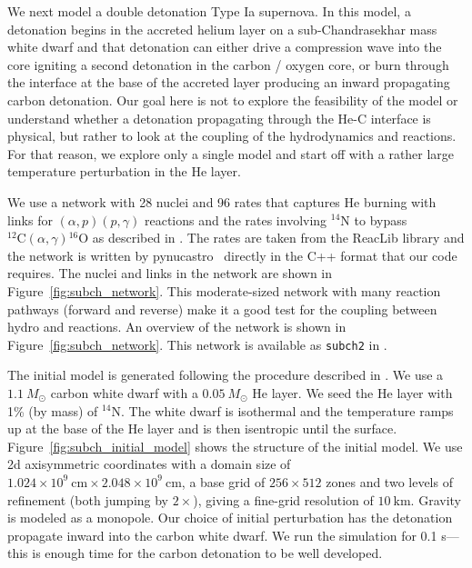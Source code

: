 \documentclass{aastex63}
\newcommand{\pynucastro}{{\sf pynucastro}}
\newcommand{\isot}[2]{$^{#2}\mathrm{#1}$}
\newcommand{\isotm}[2]{{}^{#2}\mathrm{#1}}
\newcommand{\MarginPar}[1]{\marginpar{\vskip-\baselineskip\raggedright\tiny\sffamily\hrule\smallskip{\color{red}#1}\par\smallskip\hrule}}
\begin{document}
We next model a double detonation Type Ia
supernova.  In this model, a detonation begins in the accreted helium
layer on a sub-Chandrasekhar mass white dwarf and that detonation can
either drive a compression wave into the core igniting a second
detonation in the carbon / oxygen core, or burn through the interface
at the base of the accreted layer producing an inward propagating
carbon detonation.  Our goal here is not to explore the feasibility of
the model or understand whether a detonation propagating through the
He-C interface is physical, but rather to look at the coupling of the
hydrodynamics and reactions.  For that reason, we explore only a
single model and start off with a rather large temperature
perturbation in the He layer.

We use a network with 28 nuclei and 96 rates that captures He burning \MarginPar{should I do a few aprox13 runs for comparison?}
with links for $(\alpha,p)(p,\gamma)$ reactions and the rates
involving \isot{N}{14} to bypass
$\isotm{C}{12}(\alpha,\gamma)\isotm{O}{16}$ as described in
\cite{shenbildsten}.  The rates are taken from the ReacLib library
\citep{reaclib} and the network is written by
\pynucastro~\citep{pynucastro} directly in the C++ format that our
code requires.  The nuclei and links in the network are shown in
Figure~\ref{fig:subch_network}.  This moderate-sized network with many
reaction pathways (forward and reverse) make it a good test for the
coupling between hydro and reactions.  An overview of the network is
shown in Figure~\ref{fig:subch_network}.  This network is available 
as {\tt subch2} in \citep{microphysics}.


The initial model is generated following the procedure described in
\citep{subchandra}.  We use a $1.1~M_\odot$ carbon white dwarf with a
$0.05~M_\odot$ He layer.  We seed the He layer with 1\% (by mass) of
\isot{N}{14}.  The white dwarf is isothermal and the temperature ramps
up at the base of the He layer and is then isentropic until the
surface.  Figure~\ref{fig:subch_initial_model} shows the structure of
the initial model.  We use 2d axisymmetric coordinates with a domain
size of $1.024\times 10^9~\mathrm{cm} \times 2.048\times
10^9~\mathrm{cm}$, a base grid of $256 \times 512$ zones and two
levels of refinement (both jumping by $2\times$), giving a fine-grid
resolution of $10~\mathrm{km}$.  Gravity is modeled as a monopole.
Our choice of initial perturbation has the detonation propagate inward
into the carbon white dwarf.  We run the simulation for 0.1 s---this
is enough time for the carbon detonation to be well developed.
\end{document}

